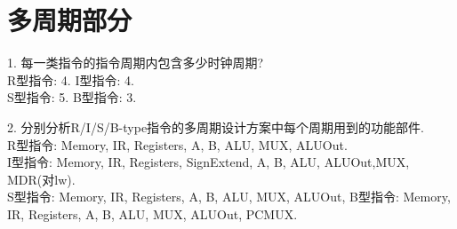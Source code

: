 \documentclass{article}
\begin{document}
\section*{多周期部分}
1. 每一类指令的指令周期内包含多少时钟周期?\\
\hspace*{0.5cm}R型指令: 4.\hspace*{1cm}     I型指令: 4.\\
\hspace*{0.5cm}S型指令: 5.\hspace*{1cm}     B型指令: 3.


2. 分别分析R/I/S/B-type指令的多周期设计方案中每个周期用到的功能部件.\\
R型指令: Memory, IR, Registers, A, B, ALU, MUX, ALUOut.\\
I型指令: Memory, IR, Registers, SignExtend, A, B, ALU, ALUOut,MUX, MDR(对lw).\\
S型指令: Memory, IR, Registers, A, B, ALU, MUX, ALUOut, 
B型指令: Memory, IR, Registers, A, B, ALU, MUX, ALUOut, PCMUX.
\end{document}
